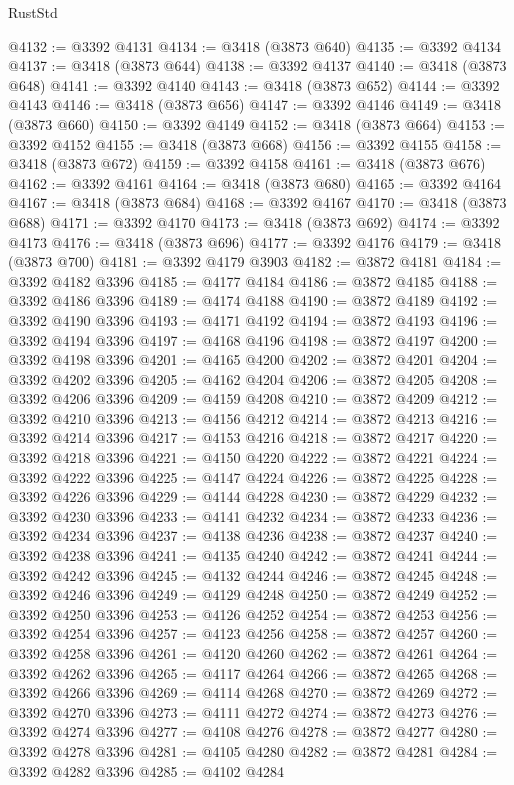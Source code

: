 \begin{lexlean}{RustStd}
\begin{coremodule}
@4132 := @3392 @4131
@4134 := @3418 (@3873 @640)
@4135 := @3392 @4134
@4137 := @3418 (@3873 @644)
@4138 := @3392 @4137
@4140 := @3418 (@3873 @648)
@4141 := @3392 @4140
@4143 := @3418 (@3873 @652)
@4144 := @3392 @4143
@4146 := @3418 (@3873 @656)
@4147 := @3392 @4146
@4149 := @3418 (@3873 @660)
@4150 := @3392 @4149
@4152 := @3418 (@3873 @664)
@4153 := @3392 @4152
@4155 := @3418 (@3873 @668)
@4156 := @3392 @4155
@4158 := @3418 (@3873 @672)
@4159 := @3392 @4158
@4161 := @3418 (@3873 @676)
@4162 := @3392 @4161
@4164 := @3418 (@3873 @680)
@4165 := @3392 @4164
@4167 := @3418 (@3873 @684)
@4168 := @3392 @4167
@4170 := @3418 (@3873 @688)
@4171 := @3392 @4170
@4173 := @3418 (@3873 @692)
@4174 := @3392 @4173
@4176 := @3418 (@3873 @696)
@4177 := @3392 @4176
@4179 := @3418 (@3873 @700)
@4181 := @3392 @4179 @3903
@4182 := @3872 @4181
@4184 := @3392 @4182 @3396
@4185 := @4177 @4184
@4186 := @3872 @4185
@4188 := @3392 @4186 @3396
@4189 := @4174 @4188
@4190 := @3872 @4189
@4192 := @3392 @4190 @3396
@4193 := @4171 @4192
@4194 := @3872 @4193
@4196 := @3392 @4194 @3396
@4197 := @4168 @4196
@4198 := @3872 @4197
@4200 := @3392 @4198 @3396
@4201 := @4165 @4200
@4202 := @3872 @4201
@4204 := @3392 @4202 @3396
@4205 := @4162 @4204
@4206 := @3872 @4205
@4208 := @3392 @4206 @3396
@4209 := @4159 @4208
@4210 := @3872 @4209
@4212 := @3392 @4210 @3396
@4213 := @4156 @4212
@4214 := @3872 @4213
@4216 := @3392 @4214 @3396
@4217 := @4153 @4216
@4218 := @3872 @4217
@4220 := @3392 @4218 @3396
@4221 := @4150 @4220
@4222 := @3872 @4221
@4224 := @3392 @4222 @3396
@4225 := @4147 @4224
@4226 := @3872 @4225
@4228 := @3392 @4226 @3396
@4229 := @4144 @4228
@4230 := @3872 @4229
@4232 := @3392 @4230 @3396
@4233 := @4141 @4232
@4234 := @3872 @4233
@4236 := @3392 @4234 @3396
@4237 := @4138 @4236
@4238 := @3872 @4237
@4240 := @3392 @4238 @3396
@4241 := @4135 @4240
@4242 := @3872 @4241
@4244 := @3392 @4242 @3396
@4245 := @4132 @4244
@4246 := @3872 @4245
@4248 := @3392 @4246 @3396
@4249 := @4129 @4248
@4250 := @3872 @4249
@4252 := @3392 @4250 @3396
@4253 := @4126 @4252
@4254 := @3872 @4253
@4256 := @3392 @4254 @3396
@4257 := @4123 @4256
@4258 := @3872 @4257
@4260 := @3392 @4258 @3396
@4261 := @4120 @4260
@4262 := @3872 @4261
@4264 := @3392 @4262 @3396
@4265 := @4117 @4264
@4266 := @3872 @4265
@4268 := @3392 @4266 @3396
@4269 := @4114 @4268
@4270 := @3872 @4269
@4272 := @3392 @4270 @3396
@4273 := @4111 @4272
@4274 := @3872 @4273
@4276 := @3392 @4274 @3396
@4277 := @4108 @4276
@4278 := @3872 @4277
@4280 := @3392 @4278 @3396
@4281 := @4105 @4280
@4282 := @3872 @4281
@4284 := @3392 @4282 @3396
@4285 := @4102 @4284

\end{coremodule}
\end{lexlean}
